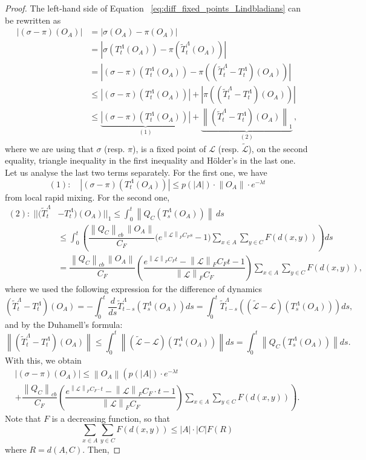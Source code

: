 \documentclass[11pt]{article}
\numberwithin{equation}{section}
\numberwithin{figure}{section}
\numberwithin{table}{section}
\theoremstyle{definition}
\theoremstyle{plain}
\theoremstyle{remark}
\newcommand{\Li}{\mathcal{L}}
\newcommand{\LL}{\widetilde{\Li}}
\newcommand{\T}{T^\Lambda}
\newcommand{\TT}{\widetilde{T}^\Lambda}
\newcommand{\norm}[1]{\left\lVert#1\right\rVert}
\newcommand{\normm}[2]{\left\lVert#1\right\rVert_{#2}}
\newcommand{\abs}[1]{\left \vert#1\right\vert}
\begin{document}
\begin{proof}

The left-hand side of Equation ~\eqref{eq:diff_fixed_points_Lindbladians} can be rewritten as
\begin{align}
\abs{(\sigma-\pi)(O_A)} &= \abs{\sigma(O_A)-\pi(O_A)} \\
&= \abs{\sigma(\T_t(O_A))-\pi(\TT_t(O_A))} \nonumber\\
&= \abs{(\sigma-\pi)(\T_t(O_A))-\pi((\TT_t-\T_t)(O_A))} \nonumber\\
&\le \abs{(\sigma-\pi)(\T_t(O_A))}+\abs{\pi((\TT_t-\T_t)(O_A))} \nonumber\\
&\le \underbrace{\abs{(\sigma-\pi)(\T_t(O_A))}}_{(1)}+\underbrace{\normm{(\TT_t-\T_t)(O_A)}{1}}_{(2)} \, , \nonumber
\end{align}
where we are using that $\sigma$ (resp. $\pi$), is a fixed point of $\Li$ (resp. $\LL$), on the second equality, triangle inequality in the first inequality and Hölder's in the last one. Let us analyse the last two terms separately. For the first one, we have
 \begin{equation*}
    (1):\quad \abs{(\sigma-\pi)(\T_t(O_A))} \leq p(\abs{A})\cdot   \norm{O_A} \cdot e^{-\lambda t}
 \end{equation*}
from local rapid mixing. For the second one, 
\begin{align}
(2):\;\lvert\lvert (\TT_t&-\T_t)(O_A)\rvert\rvert_1
\le \int_0^t \norm{Q_C(\T_s(O_A))}\,ds \\
&\nonumber\le \int_0^t\!\left(\dfrac{\normm{Q_C}{cb}\,\norm{O_A}}{C_F}\Big(e^{\normm{\Li}{F} C_F s}-1\Big)\sum_{x\in A}\sum_{y\in C}F(d(x,y))\right)\!ds
\\
&= \dfrac{\normm{Q_C}{cb}\,\norm{O_A}}{C_F}\left(\dfrac{e^{\normm{\Li}{F} C_F t}-\normm{\Li}{F} C_F t-1}{\normm{\Li}{F} C_F}\right)\sum_{x\in A}\sum_{y\in C}F(d(x,y)),
\nonumber
\end{align}
where we used the following expression for the difference of dynamics
\begin{equation}
    (\TT_t-\T_t)(O_A)=-\int_0^t \dfrac{d}{ds}\TT_{t-s}(\T_s(O_A)) ds=\int_0^t \TT_{t-s}((\LL-\Li)(\T_s(O_A)))ds , 
\end{equation}
and by the Duhamell's formula:
\begin{equation}
    \norm{(\TT_t-\T_t)(O_A)}\leq \int_0^t \norm{(\LL-\Li)(\T_s(O_A))}ds=\int_0^t \norm{Q_C(\T_s(O_A))}ds.
\end{equation}
With this, we obtain
\begin{multline}
    \abs{(\sigma-\pi)(O_A)}\leq\norm{O_A}\left (  p(\abs{A})\cdot e^{-\lambda t}\right.\\
    + \left.\dfrac{\normm{Q_C}{cb}}{C_F}\left ( \dfrac{e^{\normm{\Li}{F} C_F \cdot t}-\normm{\Li}{F} C_F\cdot t-1}{\normm{\Li}{F} C_F}\right ) \sum_{x\in A}\sum_{y\in C}F(d(x,y)) \right).
\end{multline}
Note that $F$ is a decreasing function, so that 
\begin{equation}
    \sum_{x\in A}\sum_{y\in C}F(d(x,y)) \leq \abs{A}\cdot\abs{C} F(R)
\end{equation}
where $R=d(A,C)$.
Then,


\end{proof}
\end{document}
